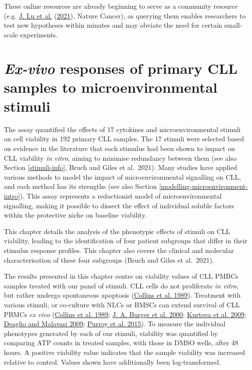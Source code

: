 \documentclass[11pt, a4paper, twosided]{book}
\begin{document}
These online resources are already beginning to serve as a community resource (e.g. \protect\hyperlink{ref-Lu2021}{J. Lu et al.} (\protect\hyperlink{ref-Lu2021}{2021}), Nature Cancer), as querying them enables researchers to test new hypotheses within minutes and may obviate the need for certain small-scale experiments.

\hypertarget{chapter4}{%
\chapter{\texorpdfstring{\emph{Ex-vivo} responses of primary CLL samples to microenvironmental stimuli}{Ex-vivo responses of primary CLL samples to microenvironmental stimuli}}\label{chapter4}}

The assay quantified the effects of 17 cytokines and microenvironmental stimuli on cell viability in 192 primary CLL samples. The 17 stimuli were selected based on evidence in the literature that each stimulus had been shown to impact on CLL viability \emph{in vitro}, aiming to minimise redundancy between them (see also Section \ref{stimuli-info}, Bruch and Giles et al.~2021). Many studies have applied various methods to model the impact of microenvironmental signalling on CLL, and each method has its strengths (see also Section \ref{modelling-microenvironment-intro}). This assay represents a reductionist model of microenvironmental signalling, making it possible to dissect the effect of individual soluble factors within the protective niche on baseline viability.

This chapter details the analysis of the phenotypic effects of stimuli on CLL viability, leading to the identification of four patient subgroups that differ in their stimulus response profiles. This chapter also covers the clinical and molecular characterisation of these four subgroups (Bruch and Giles et al.~2021).

The results presented in this chapter centre on viability values of CLL PMBCs samples treated with our panel of stimuli. CLL cells do not proliferate \emph{in vitro}, but rather undergo spontaneous apoptosis (\protect\hyperlink{ref-Collins1989}{Collins et al. 1989}). Treatment with various stimuli, or co-culture with NLCs or BMSCs can extend survival of CLL PBMCs \emph{ex vivo} (\protect\hyperlink{ref-Collins1989}{Collins et al. 1989}; \protect\hyperlink{ref-Burger2000}{J. A. Burger et al. 2000}; \protect\hyperlink{ref-Kurtova2009}{Kurtova et al. 2009}; \protect\hyperlink{ref-Deaglio2009}{Deaglio and Malavasi 2009}; \protect\hyperlink{ref-Purroy2015}{Purroy et al. 2015}). To measure the individual phenotypes generated by each of our stimuli, viability was quantified by comparing ATP counts in treated samples, with those in DMSO wells, after 48 hours. A positive viability value indicates that the sample viability was increased relative to control. Values shown have additionally been log-transformed.
\end{document}
